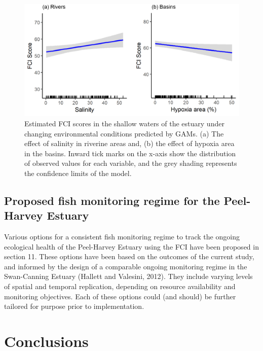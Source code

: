 \documentclass[
]{book}
\begin{document}
\begin{figure}
\includegraphics[width=1\linewidth]{images/fish_ecology/picture18} \caption{Estimated FCI scores in the shallow waters of the estuary under changing environmental conditions predicted by GAMs. (a) The effect of salinity in riverine areas and, (b) the effect of hypoxia area in the basins. Inward tick marks on the x-axis show the distribution of observed values for each variable, and the grey shading represents the confidence limits of the model.}\label{fig:fish-ecology-pic18}
\end{figure}

\hypertarget{proposed-fish-monitoring-regime-for-the-peel-harvey-estuary}{%
\subsection{Proposed fish monitoring regime for the Peel-Harvey Estuary}\label{proposed-fish-monitoring-regime-for-the-peel-harvey-estuary}}

Various options for a consistent fish monitoring regime to track the ongoing ecological health of the Peel-Harvey Estuary using the FCI have been proposed in section 11. These options have been based on the outcomes of the current study, and informed by the design of a comparable ongoing monitoring regime in the Swan-Canning Estuary (Hallett and Valesini, 2012). They include varying levels of spatial and temporal replication, depending on resource availability and monitoring objectives. Each of these options could (and should) be further tailored for purpose prior to implementation.~

\hypertarget{conclusions-1}{%
\section{Conclusions}\label{conclusions-1}}
\end{document}
